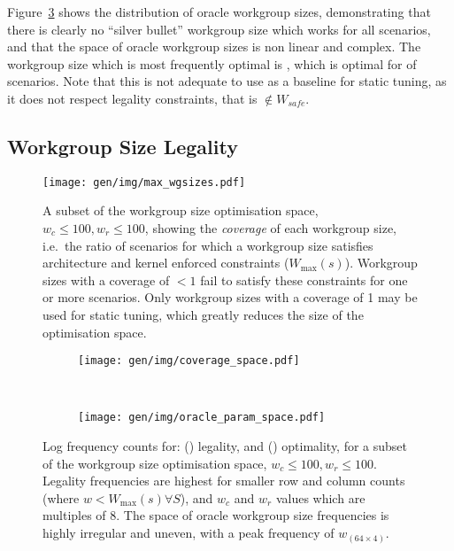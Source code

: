 Figure~\ref{fig:oracle-wgsizes} shows the distribution of oracle
workgroup sizes, demonstrating that there is clearly no ``silver
bullet'' workgroup size which works for all scenarios, and that the
space of oracle workgroup sizes is non linear and complex. The
workgroup size which is most frequently optimal is
, which is optimal for
 of scenarios. Note that this is
not adequate to use as a baseline for static tuning, as it does not
respect legality constraints, that is
$ \not\in W_{safe}$.


\subsection{Workgroup Size Legality}\label{subsec:legality}

\begin{figure}
  \centering
  \texttt{[image: gen/img/max\_wgsizes.pdf]}
  \vspace{-1.5em} %
  \caption{%
    A subset of the workgroup size optimisation space,
    $w_c \le 100, w_r \le 100$, showing the \emph{coverage} of each
    workgroup size, i.e.\ the ratio of scenarios for which a workgroup
    size satisfies architecture and kernel enforced constraints
    ($W_{\max}(s)$). Workgroup sizes with a coverage of $< 1$ fail to
    satisfy these constraints for one or more scenarios. Only
    workgroup sizes with a coverage of 1 may be used for static
    tuning, which greatly reduces the size of the optimisation space.%
  }
\label{fig:max-wgsizes}
\end{figure}

\begin{figure}
\begin{subfigure}[t]{0.98\textwidth}
\centering
\texttt{[image: gen/img/coverage\_space.pdf]}
\vspace{-1.5em} %
\caption{}
\label{fig:coverage}
\end{subfigure}
\\
\begin{subfigure}[t]{0.98\textwidth}
\centering
\texttt{[image: gen/img/oracle\_param\_space.pdf]}
\vspace{-1.5em} %
\caption{}
\label{fig:oracle-wgsizes}
\end{subfigure}
\caption{%
  Log frequency counts for: () legality, and
  () optimality, for a subset of the
  workgroup size optimisation space, $w_c \le 100, w_r \le 100$.
  Legality frequencies are highest for smaller row and column counts
  (where $w < W_{\max}(s) \forall S$), and $w_c$ and $w_r$ values
  which are multiples of 8. The space of oracle workgroup size
  frequencies is highly irregular and uneven, with a peak frequency of
  $w_{(64 \times 4)}$.%
}
\label{fig:heatmaps}
\end{figure}

